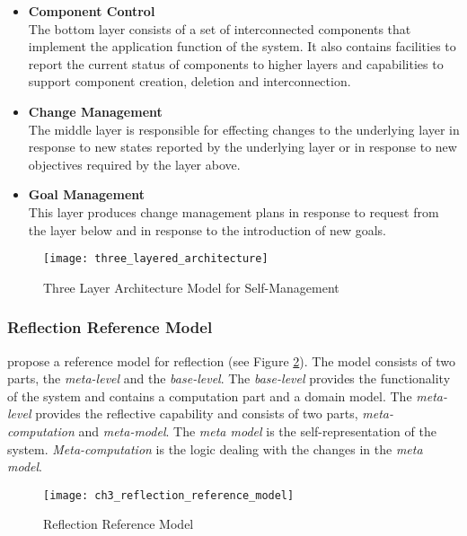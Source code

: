 \begin{itemize}
	\item \textbf{Component Control}\\
	The bottom layer consists of a set of interconnected components that implement the application function of the system. It also contains facilities to report the current status of components to higher layers and capabilities to support component creation, deletion and interconnection.
	\item \textbf{Change Management}\\
	The middle layer is responsible for effecting changes to the underlying layer in response to new states reported by the underlying layer or in response to new objectives required by the layer above. 
	\item \textbf{Goal Management}\\
	This layer produces change management plans in response to request from the layer below and in response to the introduction of new goals.
\end{itemize}

\begin{figure}[htbp]
	\centering
	\texttt{[image: three\_layered\_architecture]}
	\caption{Three Layer Architecture Model for Self-Management \citep{Kramer:2007ff}}
	\label{fig:ch03_three_layer_architecture}
\end{figure}

\subsubsection{Reflection Reference Model}
\cite{Andersson:2009bq} propose a reference model for reflection (see Figure \ref{fig:ch03_reflection_reference_model}). The model consists of two parts, the \emph{meta-level} and the \emph{base-level}. The \emph{base-level} provides the functionality of the system and contains a computation part and a domain model. The \emph{meta-level} provides the reflective capability and consists of two parts, \emph{meta-computation} and \emph{meta-model}. The \emph{meta model} is the self-representation of the system. \emph{Meta-computation} is the logic dealing with the changes in the \emph{meta model}.

\begin{figure}[htbp]
	\centering
	\texttt{[image: ch3\_reflection\_reference\_model]}
	\caption{Reflection Reference Model \citep{Andersson:2009bq}}
	\label{fig:ch03_reflection_reference_model}
\end{figure}


